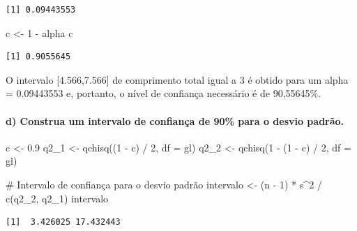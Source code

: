 \documentclass[
  letterpaper,
  DIV=11,
  numbers=noendperiod]{scrartcl}
\let\oldparagraph\paragraph
\renewcommand{\paragraph}[1]{\oldparagraph{#1}\mbox{}}
\newenvironment{Shaded}{\begin{snugshade}}{\end{snugshade}}
\newcommand{\AttributeTok}[1]{\textcolor[rgb]{0.40,0.45,0.13}{#1}}
\newcommand{\CommentTok}[1]{\textcolor[rgb]{0.37,0.37,0.37}{#1}}
\newcommand{\DecValTok}[1]{\textcolor[rgb]{0.68,0.00,0.00}{#1}}
\newcommand{\FloatTok}[1]{\textcolor[rgb]{0.68,0.00,0.00}{#1}}
\newcommand{\FunctionTok}[1]{\textcolor[rgb]{0.28,0.35,0.67}{#1}}
\newcommand{\NormalTok}[1]{\textcolor[rgb]{0.00,0.23,0.31}{#1}}
\newcommand{\OtherTok}[1]{\textcolor[rgb]{0.00,0.23,0.31}{#1}}
\newcommand{\SpecialCharTok}[1]{\textcolor[rgb]{0.37,0.37,0.37}{#1}}
\begin{document}
\begin{verbatim}
[1] 0.09443553
\end{verbatim}

\begin{Shaded}
\begin{Highlighting}[]
\NormalTok{c }\OtherTok{\textless{}{-}} \DecValTok{1} \SpecialCharTok{{-}}\NormalTok{ alpha}
\NormalTok{c}
\end{Highlighting}
\end{Shaded}

\begin{verbatim}
[1] 0.9055645
\end{verbatim}

O intervalo {[}4.566,7.566{]} de comprimento total igual a 3 é obtido
para um alpha = 0.09443553 e, portanto, o nível de confiança necessário
é de 90,55645\%.

\hypertarget{d-construa-um-intervalo-de-confianuxe7a-de-90-para-o-desvio-padruxe3o.}{%
\paragraph{d) Construa um intervalo de confiança de 90\% para o desvio
padrão.}\label{d-construa-um-intervalo-de-confianuxe7a-de-90-para-o-desvio-padruxe3o.}}

\begin{Shaded}
\begin{Highlighting}[]
\NormalTok{c }\OtherTok{\textless{}{-}} \FloatTok{0.9}
\NormalTok{q2\_1 }\OtherTok{\textless{}{-}} \FunctionTok{qchisq}\NormalTok{((}\DecValTok{1} \SpecialCharTok{{-}}\NormalTok{ c) }\SpecialCharTok{/} \DecValTok{2}\NormalTok{, }\AttributeTok{df =}\NormalTok{ gl)}
\NormalTok{q2\_2 }\OtherTok{\textless{}{-}} \FunctionTok{qchisq}\NormalTok{(}\DecValTok{1} \SpecialCharTok{{-}}\NormalTok{ (}\DecValTok{1} \SpecialCharTok{{-}}\NormalTok{ c) }\SpecialCharTok{/} \DecValTok{2}\NormalTok{, }\AttributeTok{df =}\NormalTok{ gl)}

\CommentTok{\# Intervalo de confiança para o desvio padrão}
\NormalTok{intervalo }\OtherTok{\textless{}{-}}\NormalTok{ (n }\SpecialCharTok{{-}} \DecValTok{1}\NormalTok{) }\SpecialCharTok{*}\NormalTok{ s}\SpecialCharTok{\^{}}\DecValTok{2} \SpecialCharTok{/} \FunctionTok{c}\NormalTok{(q2\_2, q2\_1)}
\NormalTok{intervalo}
\end{Highlighting}
\end{Shaded}

\begin{verbatim}
[1]  3.426025 17.432443
\end{verbatim}
\end{document}
